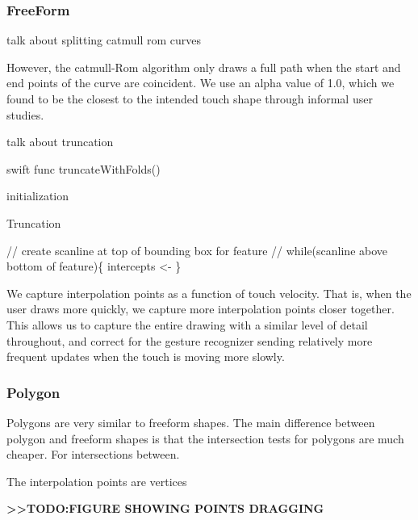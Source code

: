 \subsubsection{FreeForm}\label{freeform}

talk about splitting catmull rom curves

However, the catmull-Rom algorithm only draws a full path when the start
and end points of the curve are coincident. We use an alpha value of
1.0, which we found to be the closest to the intended touch shape
through informal user studies.

talk about truncation

\small
\singlespacing 

\begin{pygmented}{swift}
func truncateWithFolds()
\end{pygmented}

\doublespacing
\normalsize

\begin{algorithm}[H]
 initialization\;
 \caption{Truncation}
\end{algorithm}

// create scanline at top of bounding box for feature // while(scanline
above bottom of feature)\{ intercepts \textless{}- \}

We capture interpolation points as a function of touch velocity. That
is, when the user draws more quickly, we capture more interpolation
points closer together. This allows us to capture the entire drawing
with a similar level of detail throughout, and correct for the gesture
recognizer sending relatively more frequent updates when the touch is
moving more slowly.

\subsubsection{Polygon}\label{polygon}

Polygons are very similar to freeform shapes. The main difference
between polygon and freeform shapes is that the intersection tests for
polygons are much cheaper. For intersections between.

The interpolation points are vertices

\textbf{\textgreater{}\textgreater{}TODO:FIGURE SHOWING POINTS DRAGGING}

